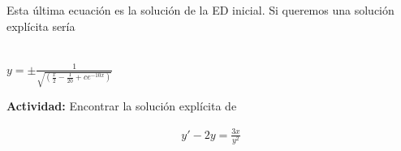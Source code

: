 \documentclass{article}
\theoremstyle{plain}
\theoremstyle{definition}
\begin{document}
Esta última ecuación es la solución de la ED inicial. Si queremos una solución explícita sería\\ \\

\begin{center}
$\displaystyle y =  \pm \frac{1}{\sqrt{ \left( \frac{x}{2} - \frac{1}{20} +ce^{-10x}\right)}} $
\end{center}



\textbf{Actividad: } Encontrar la solución explícita de

\begin{align*}
    y'-2y =\frac{3x}{y^2}
\end{align*}
\end{document}
